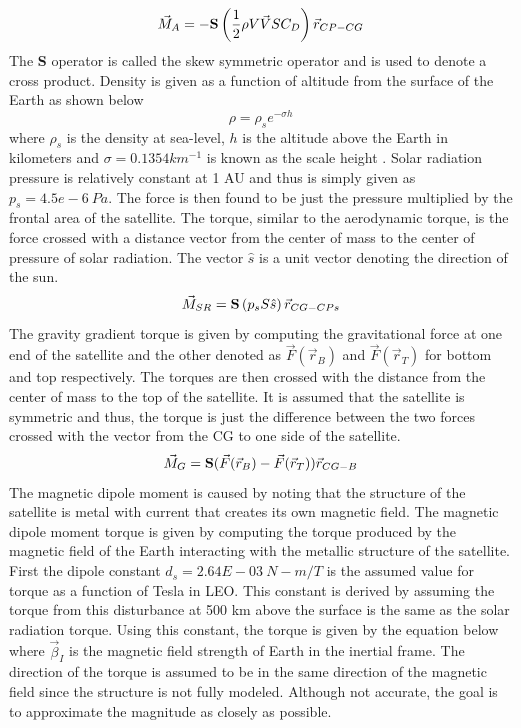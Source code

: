 \documentclass[conf]{new-aiaa}
\begin{document}
\begin{equation}
    \vec{M}_A = -{\bf S}\left(\frac{1}{2}\rho V\vec{V}S C_D\right)\vec{r}_{CP-CG}
\end{equation}
The {\bf S} operator is called the skew symmetric operator and is used to denote a cross product. Density is given as a function of altitude from the surface of the Earth as shown below
 \begin{equation}
     \rho = \rho_s e^{-\sigma h}
\end{equation}
where $\rho_s$ is the density at sea-level, $h$ is the altitude above the Earth in kilometers and $\sigma = 0.1354 km^{-1}$ is known as the scale height \cite{Jacchia}. 
Solar radiation pressure is relatively constant at 1 AU and thus is simply given as $p_s=4.5e-6~Pa$. The force is then found to be just the pressure multiplied by the frontal area of the satellite. The torque, similar to the aerodynamic torque, is the force crossed with a distance vector from the center of mass to the center of pressure of solar radiation. The vector $\hat{s}$ is a unit vector denoting the direction of the sun.
\begin{equation}
    \vec{M}_{SR} = {\bf S} \left( p_s S \hat{s} \right) \vec{r}_{CG-CPs}
\end{equation}
The gravity gradient torque is given by computing the gravitational force at one end of the satellite and the other denoted as $\vec{F}(\vec{r}_B)$ and $\vec{F}(\vec{r}_T)$ for bottom and top respectively. The torques are then crossed with the distance from the center of mass to the top of the satellite. It is assumed that the satellite is symmetric and thus, the torque is just the difference between the two forces crossed with the vector from the CG to one side of the satellite.
\begin{equation}
    \vec{M}_G = {\bf S}(\vec{F}(\vec{r}_B)-\vec{F}(\vec{r}_T))\vec{r}_{CG-B}
\end{equation}
The magnetic dipole moment is caused by noting that the structure of the satellite is metal with current that creates its own magnetic field. The magnetic dipole moment torque is given by computing the torque produced by the magnetic field of the Earth interacting with the metallic structure of the satellite. First the dipole constant $d_s=2.64E-03~N-m/T$ is the assumed value for torque as a function of Tesla in LEO. This constant is derived by assuming the torque from this disturbance at 500 km above the surface is the same as the solar radiation torque. Using this constant, the torque is given by the equation below where $\vec{\beta}_I$ is the magnetic field strength of Earth in the inertial frame. The direction of the torque is assumed to be in the same direction of the magnetic field since the structure is not fully modeled. Although not accurate, the goal is to approximate the magnitude as closely as possible. 
\end{document}
